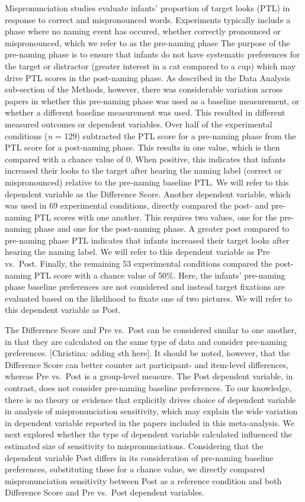 \documentclass[man]{apa6}
\theoremstyle{definition}
\theoremstyle{definition}
\theoremstyle{definition}
\theoremstyle{remark}
\begin{document}
Mispronunciation studies evaluate infants' proportion of target looks
(PTL) in response to correct and mispronounced words. Experiments
typically include a phase where no naming event has occured, whether
correctly pronounced or mispronounced, which we refer to as the
pre-naming phase The purpose of the pre-naming phase is to ensure that
infants do not have systematic preferences for the target or distractor
(greater interest in a cat compared to a cup) which may drive PTL scores
in the post-naming phase. As described in the Data Analysis sub-section
of the Methods, however, there was considerable variation across papers
in whether this pre-naming phase was used as a baseline measurement, or
whether a different baseline measurement was used. This resulted in
different measured outcomes or dependent variables. Over half of the
experimental conditions (\emph{n} = 129) subtracted the PTL score for a
pre-naming phase from the PTL score for a post-naming phase. This
results in one value, which is then compared with a chance value of 0.
When positive, this indicates that infants increased their looks to the
target after hearing the naming label (correct or mispronounced)
relative to the pre-naming baseline PTL. We will refer to this dependent
variable as the Difference Score. Another dependent variable, which was
used in 69 experimental conditions, directly compared the post- and
pre-naming PTL scores with one another. This requires two values, one
for the pre-naming phase and one for the post-naming phase. A greater
post compared to pre-naming phase PTL indicates that infants increased
their target looks after hearing the naming label. We will refer to this
dependent variable as Pre vs.~Post. Finally, the remaining 53
experimental conditions compared the post-naming PTL score with a chance
value of 50\%. Here, the infants' pre-naming phase baseline preferences
are not considered and instead target fixations are evaluated based on
the likelihood to fixate one of two pictures. We will refer to this
dependent variable as Post.

The Difference Score and Pre vs.~Post can be considered similar to one
another, in that they are calculated on the same type of data and
consider pre-naming preferences. {[}Christina: adding sth here{]}. It
should be noted, however, that the Difference Score can better counter
act participant- and item-level differences, whereas Pre vs.~Post is a
group-level measure. The Post dependent variable, in contrast, does not
consider pre-naming baseline preferences. To our knowledge, there is no
theory or evidence that explicitly drives choice of dependent variable
in analysis of mispronunciation sensitivity, which may explain the wide
variation in dependent variable reported in the papers included in this
meta-analysis. We next explored whether the type of dependent variable
calculated influenced the estimated size of sensitivity to
mispronunciations. Considering that the dependent variable Post differs
in its consideration of pre-naming baseline preferences, substituting
these for a chance value, we directly compared mispronunciation
sensitivity between Post as a reference condition and both Difference
Score and Pre vs.~Post dependent variables.
\end{document}
